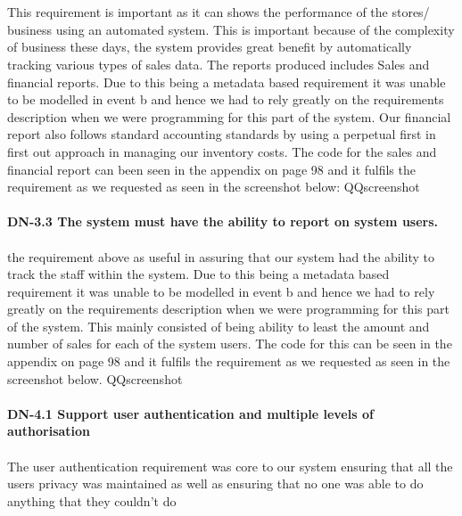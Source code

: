 \documentclass[a4paper]{article}
\begin{document}
\\\\
This requirement is important as it can shows the performance of the stores/ business using an automated system. This is important because of the complexity of business these days, the system provides great benefit by automatically tracking various types of sales data. The reports produced includes Sales and financial reports. Due to this being a metadata based requirement it was unable to be modelled in event b and hence we had to rely greatly on the requirements description when we were programming for this part of the system. Our financial report also follows standard accounting standards by using a perpetual first in first out approach in managing our inventory costs. The code for the sales and financial report can been seen in the appendix on page 98 and it fulfils the requirement as we requested as seen in the screenshot below: QQscreenshot
\\\\

\textbf{DN-3.3 The system must have the ability to report on system users.}
\\\\
the requirement above as useful in assuring that our system had the ability to track the staff within the system. Due to this being a metadata based requirement it was unable to be modelled in event b and hence we had to rely greatly on the requirements description when we were programming for this part of the system. This mainly consisted of being ability to least the amount and number of sales for each of the system users. The code for this can be seen in the appendix on page 98 and it fulfils the requirement as we requested as seen in the screenshot below. QQscreenshot
\\\\
\textbf{DN-4.1 Support user authentication and multiple levels of authorisation}
\\\\
The user authentication requirement was core to our system ensuring that all the users privacy was maintained as well as ensuring that no one was able to do anything that they couldn't do
\\\\
\end{document}
